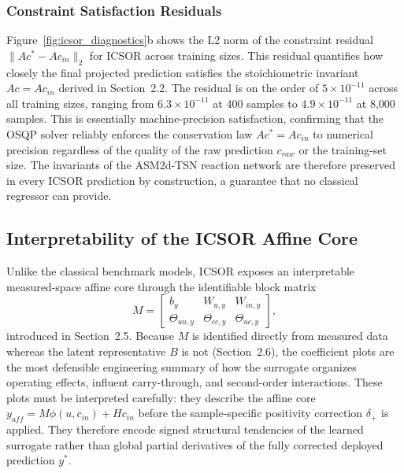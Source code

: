 \documentclass[11pt]{article}
\begin{document}
\subsubsection{Constraint Satisfaction Residuals}

Figure~\ref{fig:icsor_diagnostics}b shows the L2 norm of the constraint residual $\|Ac^* - Ac_{in}\|_2$ for ICSOR across training sizes. This residual quantifies how closely the final projected prediction satisfies the stoichiometric invariant $Ac = Ac_{in}$ derived in Section~2.2. The residual is on the order of $5 \times 10^{-11}$ across all training sizes, ranging from $6.3 \times 10^{-11}$ at 400 samples to $4.9 \times 10^{-11}$ at 8{,}000 samples. This is essentially machine-precision satisfaction, confirming that the OSQP solver reliably enforces the conservation law $Ac^* = Ac_{in}$ to numerical precision regardless of the quality of the raw prediction $c_{raw}$ or the training-set size. The invariants of the ASM2d-TSN reaction network are therefore preserved in every ICSOR prediction by construction, a guarantee that no classical regressor can provide.

\subsection{Interpretability of the ICSOR Affine Core}

Unlike the classical benchmark models, ICSOR exposes an interpretable measured-space affine core through the identifiable block matrix
\begin{equation*}
M = \begin{bmatrix}
b_y & W_{u,y} & W_{in,y} \\
\Theta_{uu,y} & \Theta_{cc,y} & \Theta_{uc,y}
\end{bmatrix},
\end{equation*}
introduced in Section~2.5. Because $M$ is identified directly from measured data whereas the latent representative $B$ is not (Section~2.6), the coefficient plots are the most defensible engineering summary of how the surrogate organizes operating effects, influent carry-through, and second-order interactions. These plots must be interpreted carefully: they describe the affine core $y_{aff} = M\phi(u,c_{in}) + Hc_{in}$ before the sample-specific positivity correction $\delta_+$ is applied. They therefore encode signed structural tendencies of the learned surrogate rather than global partial derivatives of the fully corrected deployed prediction $y^*$.
\end{document}
